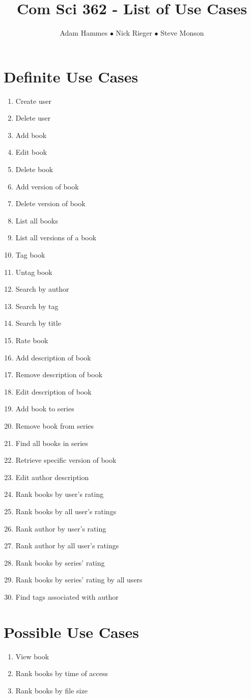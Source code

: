 \documentclass[11pt]{article}
\title{Com Sci 362 - List of Use Cases}
\author{Adam Hammes $\bullet$ Nick Rieger $\bullet$ Steve Monson}
\begin{document}
\maketitle


\section*{Definite Use Cases}

\begin{enumerate}[(1)]
    \item Create user
    \item Delete user
    \item Add book
    \item Edit book
    \item Delete book
    \item Add version of book
    \item Delete version of book
    \item List all books
    \item List all versions of a book
    \item Tag book
    \item Untag book
    \item Search by author
    \item Search by tag
    \item Search by title
    \item Rate book
    \item Add description of book
    \item Remove description of book
    \item Edit description of book
    \item Add book to series
    \item Remove book from series
    \item Find all books in series
    \item Retrieve specific version of book
    \item Edit author description
    \item Rank books by user's rating
    \item Rank books by all user's ratings
    \item Rank author by user's rating
    \item Rank author by all user's ratings
    \item Rank books by series' rating
    \item Rank books by series' rating by all users
    \item Find tags associated with author
\end{enumerate}


\section*{Possible Use Cases}

\begin{enumerate}[(1)]
    \item View book
    \item Rank books by time of access
    \item Rank books by file size
\end{enumerate}
\end{document}
